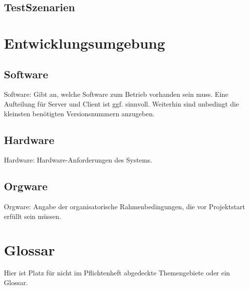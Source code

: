 \documentclass[a4paper]{scrreprt}
\begin{document}
\section{TestSzenarien}
 

\chapter{Entwicklungsumgebung}
 
\section{Software}
Software: Gibt an, welche Software zum Betrieb vorhanden sein muss. Eine
Aufteilung für Server und Client ist ggf. sinnvoll. Weiterhin sind unbedingt die
kleinsten benötigten Versionsnummern anzugeben.
 
\section{Hardware}
Hardware: Hardware-Anforderungen des Systems.
 
\section{Orgware}
Orgware: Angabe der organisatorische Rahmenbedingungen, die vor Projektstart
erfüllt sein müssen.
 
 
\chapter{Glossar}
Hier ist Platz für nicht im Pflichtenheft abgedeckte Themengebiete oder ein
Glossar.
 
\listoffigures
 
\end{document}
